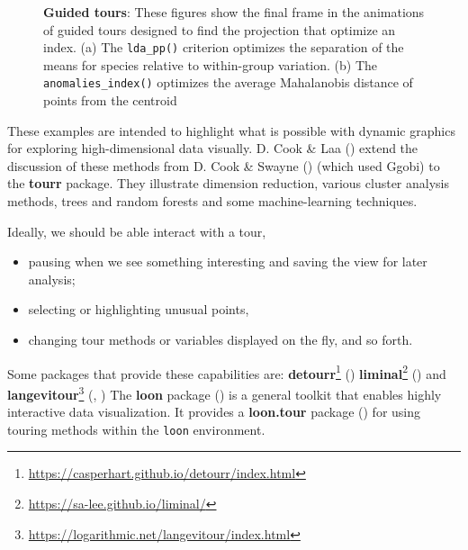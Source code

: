 \documentclass[
  letterpaper,
  10pt,
  krantz2]{krantz}
\providecommand{\tightlist}{%
  \setlength{\itemsep}{0pt}\setlength{\parskip}{0pt}}\usepackage{longtable,booktabs,array}
\providecommand{\href}[2]{#2\footnote{\url{#1}}}
\begin{document}
\begin{figure}
\begin{minipage}{0.50\linewidth}
{}


\end{minipage}%

\caption{\label{fig-peng-tour-guided}\textbf{Guided tours}: These
figures show the final frame in the animations of guided tours designed
to find the projection that optimize an index. (a) The
\texttt{lda\_pp()} criterion optimizes the separation of the means for
species relative to within-group variation. (b) The
\texttt{anomalies\_index()} optimizes the average Mahalanobis distance
of points from the centroid}

\end{figure}%

These examples are intended to highlight what is possible with dynamic
graphics for exploring high-dimensional data visually. D. Cook \& Laa
() extend the discussion of these
methods from D. Cook \& Swayne ()
(which used Ggobi) to the \textbf{tourr} package. They illustrate
dimension reduction, various cluster analysis methods, trees and random
forests and some machine-learning techniques.

Ideally, we should be able interact with a tour,

\begin{itemize}
\tightlist
\item
  pausing when we see something interesting and saving the view for
  later analysis;
\item
  selecting or highlighting unusual points,
\item
  changing tour methods or variables displayed on the fly, and so forth.
\end{itemize}

Some packages that provide these capabilities are:
\href{https://casperhart.github.io/detourr/index.html}{\textbf{detourr}}
()
\href{https://sa-lee.github.io/liminal/}{\textbf{liminal}}
() and
\href{https://logarithmic.net/langevitour/index.html}{\textbf{langevitour}}
(,
) The \textbf{loon} package
() is a general toolkit
that enables highly interactive data visualization. It provides a
\textbf{loon.tour} package () for using touring methods within the \texttt{loon} environment.
\end{document}
